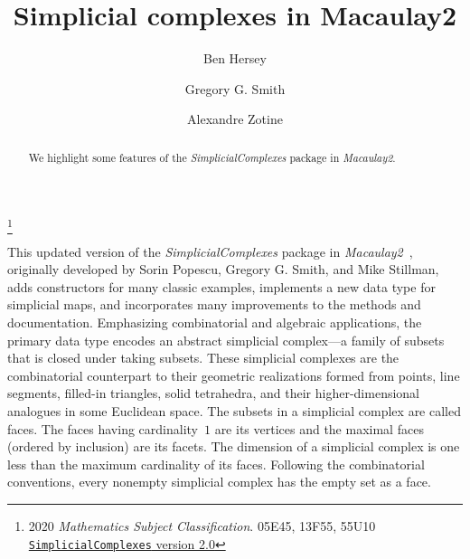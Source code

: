 \documentclass[12pt,leqno]{amsart}
\theoremstyle{definition}
\begin{document}
\vspace*{-4.5em}

\title[Simplicial Complexes]{Simplicial complexes in Macaulay2}

\author[B.~Hersey]{Ben Hersey}
\author[G.G.~Smith]{Gregory G.{} Smith} 
\author[A.~Zotine]{Alexandre Zotine}

\address{Department of Mathematics and Statistics, Queen's
  University, Kingston, Ontario, K7L 3N6
  {\normalfont\texttt{hersey.b@queensu.ca}},
  {\normalfont\texttt{ggsmith@mast.queensu.ca}},
  {\normalfont\texttt{18az45@queensu.ca}}.
}

\thanks{2020 \emph{Mathematics Subject Classification}. 05E45, 13F55,
  55U10\\
  \indent
  \href{http://www2.macaulay2.com/Macaulay2/doc/Macaulay2-1.20/share/doc/Macaulay2/SimplicialComplexes/html/index.html}{\texttt{SimplicialComplexes} version 2.0}}

\begin{abstract}
  We highlight some features of the \emph{SimplicialComplexes} package in
  \emph{Macaulay2}.
\end{abstract}

\maketitle

\vspace{-0.5em}

\noindent
This updated version of the \emph{SimplicialComplexes} package in
\emph{Macaulay2}~\cite{M2}, originally developed by Sorin Popescu, Gregory
G. Smith, and Mike Stillman, adds constructors for many classic examples,
implements a new data type for simplicial maps, and incorporates many
improvements to the methods and documentation.  Emphasizing combinatorial and
algebraic applications, the primary data type encodes an abstract simplicial
complex---a family of subsets that is closed under taking subsets.  These
simplicial complexes are the combinatorial counterpart to their geometric
realizations formed from points, line segments, filled-in triangles, solid
tetrahedra, and their higher-dimensional analogues in some Euclidean space.
The subsets in a simplicial complex are called faces. The faces having
cardinality~$1$ are its vertices and the maximal faces (ordered by inclusion)
are its facets.  The dimension of a simplicial complex is one less than the
maximum cardinality of its faces. Following the combinatorial conventions,
every nonempty simplicial complex has the empty set as a face.
\end{document}
